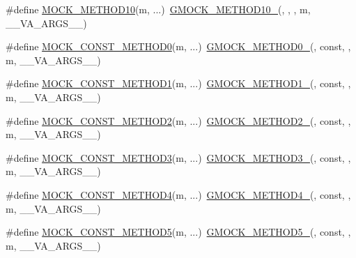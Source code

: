 \begin{DoxyCompactItemize}
\#define \hyperlink{gmock-generated-function-mockers_8h_a01760fdd295f5a92264eed6a9ff1dbf8}{M\+O\+C\+K\+\_\+\+M\+E\+T\+H\+O\+D10}(m, ...)~\hyperlink{gmock-generated-function-mockers_8h_a81a48223a8771de36ef92ac6d56f6e81}{G\+M\+O\+C\+K\+\_\+\+M\+E\+T\+H\+O\+D10\+\_\+}(, , , m, \+\_\+\+\_\+\+V\+A\+\_\+\+A\+R\+G\+S\+\_\+\+\_\+)
\item 
\#define \hyperlink{gmock-generated-function-mockers_8h_ac86e04e649fa8bf35b5f0149a13c935d}{M\+O\+C\+K\+\_\+\+C\+O\+N\+S\+T\+\_\+\+M\+E\+T\+H\+O\+D0}(m, ...)~\hyperlink{gmock-generated-function-mockers_8h_ae0d290ffa58d7c624b2e3487ba1252f4}{G\+M\+O\+C\+K\+\_\+\+M\+E\+T\+H\+O\+D0\+\_\+}(, const, , m, \+\_\+\+\_\+\+V\+A\+\_\+\+A\+R\+G\+S\+\_\+\+\_\+)
\item 
\#define \hyperlink{gmock-generated-function-mockers_8h_a6f76aeb56f492cfe538e177b6aa77965}{M\+O\+C\+K\+\_\+\+C\+O\+N\+S\+T\+\_\+\+M\+E\+T\+H\+O\+D1}(m, ...)~\hyperlink{gmock-generated-function-mockers_8h_a1bc0012d62440dda77208dabdf4925c9}{G\+M\+O\+C\+K\+\_\+\+M\+E\+T\+H\+O\+D1\+\_\+}(, const, , m, \+\_\+\+\_\+\+V\+A\+\_\+\+A\+R\+G\+S\+\_\+\+\_\+)
\item 
\#define \hyperlink{gmock-generated-function-mockers_8h_a31c489715704817a3f40d178404c61e8}{M\+O\+C\+K\+\_\+\+C\+O\+N\+S\+T\+\_\+\+M\+E\+T\+H\+O\+D2}(m, ...)~\hyperlink{gmock-generated-function-mockers_8h_a885295ca6bebb15efb3fc786218c5d47}{G\+M\+O\+C\+K\+\_\+\+M\+E\+T\+H\+O\+D2\+\_\+}(, const, , m, \+\_\+\+\_\+\+V\+A\+\_\+\+A\+R\+G\+S\+\_\+\+\_\+)
\item 
\#define \hyperlink{gmock-generated-function-mockers_8h_a9e67763df6705172e1a2ae92f1446bbc}{M\+O\+C\+K\+\_\+\+C\+O\+N\+S\+T\+\_\+\+M\+E\+T\+H\+O\+D3}(m, ...)~\hyperlink{gmock-generated-function-mockers_8h_af7c77ba511c631de02bb8c45a6ed3045}{G\+M\+O\+C\+K\+\_\+\+M\+E\+T\+H\+O\+D3\+\_\+}(, const, , m, \+\_\+\+\_\+\+V\+A\+\_\+\+A\+R\+G\+S\+\_\+\+\_\+)
\item 
\#define \hyperlink{gmock-generated-function-mockers_8h_a4614e9d6b24dff60c30dd4dedf494c6c}{M\+O\+C\+K\+\_\+\+C\+O\+N\+S\+T\+\_\+\+M\+E\+T\+H\+O\+D4}(m, ...)~\hyperlink{gmock-generated-function-mockers_8h_ab6430f2cfad9de4aca5258ea559294bb}{G\+M\+O\+C\+K\+\_\+\+M\+E\+T\+H\+O\+D4\+\_\+}(, const, , m, \+\_\+\+\_\+\+V\+A\+\_\+\+A\+R\+G\+S\+\_\+\+\_\+)
\item 
\#define \hyperlink{gmock-generated-function-mockers_8h_ab7021ec2b869e7c9ea90363ee675f19b}{M\+O\+C\+K\+\_\+\+C\+O\+N\+S\+T\+\_\+\+M\+E\+T\+H\+O\+D5}(m, ...)~\hyperlink{gmock-generated-function-mockers_8h_a9e3ecd392499ab19a4a6d3adcabf56f6}{G\+M\+O\+C\+K\+\_\+\+M\+E\+T\+H\+O\+D5\+\_\+}(, const, , m, \+\_\+\+\_\+\+V\+A\+\_\+\+A\+R\+G\+S\+\_\+\+\_\+)

\end{DoxyCompactItemize}
